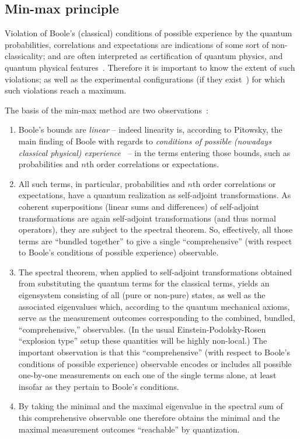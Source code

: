\subsection{Min-max principle}

Violation of  Boole's
(classical) conditions of possible experience
by the quantum probabilities, correlations  and expectations
are indications of some sort of non-classicality;
and are often interpreted as certification of
quantum physics, and quantum physical features~\cite{belrand2010,Um-2013}.
Therefore it is important to know the extent of such violations; as well as the experimental configurations
(if they exist~\cite{specker57})
for which such violations reach a maximum.

The basis of the min-max method are two observations~\cite{filipp-svo-04-qpoly-prl}:
\begin{enumerate}
\item
Boole's bounds  are {\em linear}  -- indeed linearity is, according to Pitowsky\cite{Pit-94},
the main finding of Boole with regards to {\em conditions of possible (nowadays classical physical) experience}~\cite{Boole,Boole-62}  --
in the terms entering those bounds, such as probabilities and $n$th order correlations or expectations.
\item
All such terms, in particular, probabilities and $n$th order correlations or expectations,
have a quantum realization as self-adjoint transformations. As coherent superpositions (linear sums and differences) of self-adjoint  transformations are again self-adjoint  transformations (and thus normal operators), they are subject to the spectral theorem. So, effectively, all those terms are ``bundled together'' to give a single ``comprehensive'' (with respect to Boole's conditions of possible experience) observable.
\item
The spectral theorem, when applied to self-adjoint  transformations obtained from substituting the quantum terms for the classical terms, yields an eigensystem consisting of all (pure or non-pure) states, as well as the associated eigenvalues which,
according to the quantum mechanical axioms,  serve as the measurement outcomes corresponding to the combined, bundled, ``comprehensive,'' observables. (In the usual Einstein-Podolsky-Rosen ``explosion type'' setup these quantities will be highly non-local.) The important observation is that this ``comprehensive'' (with respect to Boole's conditions of possible experience) observable encodes or includes all possible one-by-one measurements on each one of the single terms alone,
at least insofar as they pertain to Boole's conditions.
\item
By taking the minimal and the maximal eigenvalue in the spectral sum of this comprehensive observable one therefore obtains the minimal and the maximal measurement outcomes ``reachable'' by quantization.
\end{enumerate}

